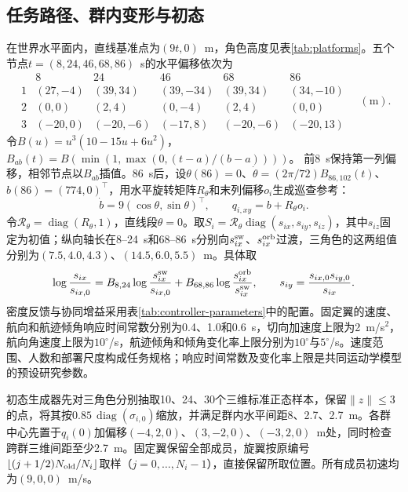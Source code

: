 \documentclass[UTF8,a4paper,11pt,fontset=none]{ctexart}
\newcommand{\diag}{\operatorname{diag}}\newcommand{\col}{\operatorname{col}}
\begin{document}
\subsection{任务路径、群内变形与初态}
在世界水平面内，直线基准点为$(9t,0)$~m，角色高度见表\ref{tab:platforms}。五个节点$t=(8,24,46,68,86)$~s的水平偏移依次为
\[
\begin{array}{c|ccccc}
 &8&24&46&68&86\\ \hline
1&(27,-4)&(39,34)&(39,-34)&(39,34)&(34,-10)\\
2&(0,0)&(2,4)&(0,-4)&(2,4)&(0,0)\\
3&(-20,0)&(-20,-6)&(-17,8)&(-20,-6)&(-20,13)
\end{array}\quad(\mathrm m).
\]
令$B(u)=u^3(10-15u+6u^2)$，$B_{ab}(t)=B(\min(1,\max(0,(t-a)/(b-a))))$。
前8~s保持第一列偏移，相邻节点以$B_{ab}$插值。86~s后，设$\theta(86)=0$、$\dot\theta=(2\pi/72)B_{86,102}(t)$、$b(86)=(774,0)^\top$，用水平旋转矩阵$R_\theta$和末列偏移$o_i$生成巡查参考：
\begin{equation}
 \dot b=9(\cos\theta,\sin\theta)^\top,\qquad q_{i,xy}=b+R_\theta o_i .
 \label{eq:engineering-reference}
\end{equation}
令$\mathcal R_\theta=\diag(R_\theta,1)$，直线段$\theta=0$。取$S_i=\mathcal R_\theta\diag(s_{ix},s_{iy},s_{iz})$，其中$s_{iz}$固定为初值；纵向轴长在8--24~s和68--86~s分别向$s_{ix}^{\rm sw}$、$s_{ix}^{\rm orb}$过渡，三角色的这两组值分别为$(7.5,4.0,4.3)$、$(14.5,6.0,5.5)$~m。具体取
\[
 \log\frac{s_{ix}}{s_{ix,0}}
 =B_{8,24}\log\frac{s_{ix}^{\rm sw}}{s_{ix,0}}
 +B_{68,86}\log\frac{s_{ix}^{\rm orb}}{s_{ix}^{\rm sw}},\qquad
 s_{iy}=\frac{s_{ix,0}s_{iy,0}}{s_{ix}} .
\]
密度反馈与协同增益采用表\ref{tab:controller-parameters}中的配置。固定翼的速度、航向和航迹倾角响应时间常数分别为0.4、1.0和0.6~s，切向加速度上限为2~m/s$^2$，航向角速度上限为$10^\circ$/s，航迹倾角和倾角变化率上限分别为$10^\circ$与$5^\circ$/s。速度范围、人数和部署尺度构成任务规格；响应时间常数及变化率上限是共同运动学模型的预设研究参数。

初态生成器先对三角色分别抽取10、24、30个三维标准正态样本，保留$\|z\|\le3$的点，将其按$0.85\,\diag(\sigma_{i,0})$缩放，并满足群内水平间距8、2.7、2.7~m。各群中心先置于$q_i(0)$加偏移$(-4,2,0)$、$(3,-2,0)$、$(-3,2,0)$~m处，同时检查跨群三维间距至少2.7~m。固定翼保留全部成员，旋翼按原编号$\lfloor(j+1/2)N_{\rm old}/N_i\rfloor$取样（$j=0,\ldots,N_i-1$），直接保留所取位置。所有成员初速均为$(9,0,0)$~m/s。
\end{document}
